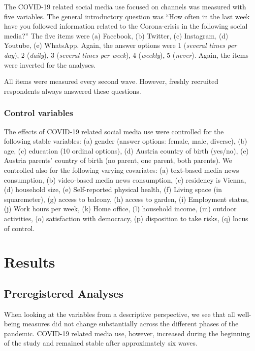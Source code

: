 \documentclass[
  english,
  man,mask,floatsintext]{apa6}
\begin{document}
The COVID-19 related social media use focused on channels was measured with five variables.
The general introductory question was ``How often in the last week have you followed information related to the Corona-crisis in the following social media?''
The five items were (a) Facebook, (b) Twitter, (c) Instagram, (d) Youtube, (e) WhatsApp.
Again, the answer options were 1 (\emph{several times per day}), 2 (\emph{daily}), 3 (\emph{several times per week}), 4 (\emph{weekly}), 5 (\emph{never}).
Again, the items were inverted for the analyses.

All items were measured every second wave.
However, freshly recruited respondents always answered these questions.

\hypertarget{control-variables}{%
\subsubsection{Control variables}\label{control-variables}}

The effects of COVID-19 related social media use were controlled for the following stable variables:
(a) gender (answer options: female, male, diverse), (b) age, (c) education (10 ordinal options), (d) Austria country of birth (yes/no), (e) Austria parents' country of birth (no parent, one parent, both parents).
We controlled also for the following varying covariates:
(a) text-based media news consumption, (b) video-based media news consumption, (c) residency is Vienna, (d) household size, (e) Self-reported physical health, (f) Living space (in squaremeter), (g) access to balcony, (h) access to garden, (i) Employment status, (j) Work hours per week, (k) Home office, (l) household income, (m) outdoor activities, (o) satisfaction with democracy, (p) disposition to take risks, (q) locus of control.

\hypertarget{results}{%
\section{Results}\label{results}}

\hypertarget{preregistered-analyses}{%
\subsection{Preregistered Analyses}\label{preregistered-analyses}}

When looking at the variables from a descriptive perspective, we see that all well-being measures did not change substantially across the different phases of the pandemic.
COVID-19 related media use, however, increased during the beginning of the study and remained stable after approximately six waves.
\end{document}
